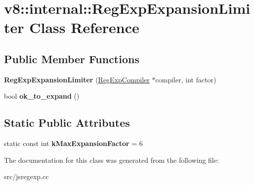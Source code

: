 \hypertarget{classv8_1_1internal_1_1_reg_exp_expansion_limiter}{}\section{v8\+:\+:internal\+:\+:Reg\+Exp\+Expansion\+Limiter Class Reference}
\label{classv8_1_1internal_1_1_reg_exp_expansion_limiter}
\subsection*{Public Member Functions}
\begin{DoxyCompactItemize}
\item 
\hypertarget{classv8_1_1internal_1_1_reg_exp_expansion_limiter_a48f9e2f2adff3a1ed31337230f1fd599}{}{\bfseries Reg\+Exp\+Expansion\+Limiter} (\hyperlink{classv8_1_1internal_1_1_reg_exp_compiler}{Reg\+Exp\+Compiler} $\ast$compiler, int factor)\label{classv8_1_1internal_1_1_reg_exp_expansion_limiter_a48f9e2f2adff3a1ed31337230f1fd599}

\item 
\hypertarget{classv8_1_1internal_1_1_reg_exp_expansion_limiter_a06bcd44dbe9806935f1c4acfd25ef07e}{}bool {\bfseries ok\+\_\+to\+\_\+expand} ()\label{classv8_1_1internal_1_1_reg_exp_expansion_limiter_a06bcd44dbe9806935f1c4acfd25ef07e}

\end{DoxyCompactItemize}
\subsection*{Static Public Attributes}
\begin{DoxyCompactItemize}
\item 
\hypertarget{classv8_1_1internal_1_1_reg_exp_expansion_limiter_a8c34bb2b6e52fc4be6f4a544643f47c6}{}static const int {\bfseries k\+Max\+Expansion\+Factor} = 6\label{classv8_1_1internal_1_1_reg_exp_expansion_limiter_a8c34bb2b6e52fc4be6f4a544643f47c6}

\end{DoxyCompactItemize}


The documentation for this class was generated from the following file\+:\begin{DoxyCompactItemize}
\item 
src/jsregexp.\+cc\end{DoxyCompactItemize}
